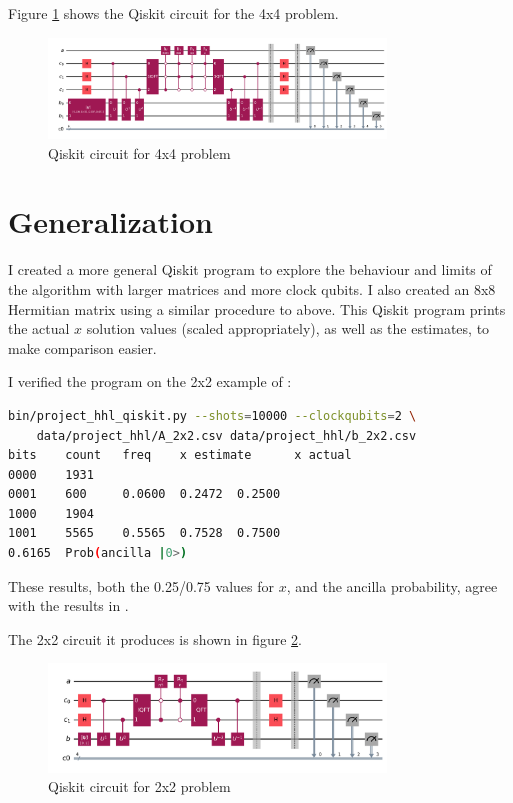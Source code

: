 \documentclass[12pt]{extarticle}
\begin{document}
Figure \ref{fig:hhl_4x4_qiskit} shows the Qiskit circuit for the 4x4 problem.
\begin{figure}[H]
\centering
\includegraphics[width=0.80\textwidth]{images/project_hhl_4x4.png}
\caption{Qiskit circuit for 4x4 problem}
\label{fig:hhl_4x4_qiskit}
\end{figure}

\newpage

\section{Generalization}\label{sec:generalization}

I created a more general Qiskit program to explore the behaviour and limits of the algorithm with larger matrices and more clock qubits.
I also created an 8x8 Hermitian matrix using a similar procedure to above.
This Qiskit program prints the actual $x$ solution values (scaled appropriately), as well as the estimates, to make comparison easier.

I verified the program on the 2x2 example of \cite{zaman2023step}:
\begin{lstlisting}[language=Bash]
bin/project_hhl_qiskit.py --shots=10000 --clockqubits=2 \
    data/project_hhl/A_2x2.csv data/project_hhl/b_2x2.csv
bits    count   freq    x estimate      x actual
0000    1931
0001    600     0.0600  0.2472  0.2500
1000    1904
1001    5565    0.5565  0.7528  0.7500
0.6165  Prob(ancilla |0>)
\end{lstlisting}

These results, both the 0.25/0.75 values for $x$, and the ancilla probability, agree with the results in \cite{zaman2023step}.

The 2x2 circuit it produces is shown in figure \ref{fig:hhl_2x2_qiskit}.
\begin{figure}[H]
\centering
\includegraphics[width=0.80\textwidth]{images/project_hhl_2x2.png}
\caption{Qiskit circuit for 2x2 problem}
\label{fig:hhl_2x2_qiskit}
\end{figure}
\end{document}
